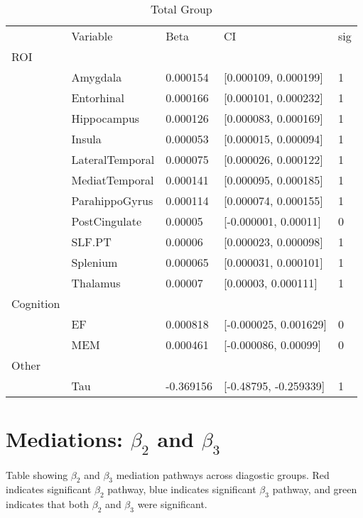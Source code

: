 \documentclass{article}
\begin{document}
\begin{table}[H]
\centering
\caption{Total Group} 
\begin{tabular}{lllll}
   & Variable & Beta & CI & sig \\ 
 ROI &   &   &   &  \\ 
   \rowcolor{green!10}  & Amygdala & 0.000154 & [0.000109, 0.000199] & 1 \\ 
   \rowcolor{green!10}  & Entorhinal & 0.000166 & [0.000101, 0.000232] & 1 \\ 
   \rowcolor{green!10}  & Hippocampus & 0.000126 & [0.000083, 0.000169] & 1 \\ 
   \rowcolor{green!10}  & Insula & 0.000053 & [0.000015, 0.000094] & 1 \\ 
   \rowcolor{green!10}  & LateralTemporal & 0.000075 & [0.000026, 0.000122] & 1 \\ 
   \rowcolor{green!10}  & MediatTemporal & 0.000141 & [0.000095, 0.000185] & 1 \\ 
   \rowcolor{green!10}  & ParahippoGyrus & 0.000114 & [0.000074, 0.000155] & 1 \\ 
    & PostCingulate & 0.00005 & [-0.000001, 0.00011] & 0 \\ 
   \rowcolor{green!10}  & SLF.PT & 0.00006 & [0.000023, 0.000098] & 1 \\ 
   \rowcolor{green!10}  & Splenium & 0.000065 & [0.000031, 0.000101] & 1 \\ 
   \rowcolor{green!10}  & Thalamus & 0.00007 & [0.00003, 0.000111] & 1 \\ 
   \midrule
Cognition &   &   &   &  \\ 
    & EF & 0.000818 & [-0.000025, 0.001629] & 0 \\ 
    & MEM & 0.000461 & [-0.000086, 0.00099] & 0 \\ 
   \midrule
Other &   &   &   &  \\ 
   \rowcolor{green!10}  & Tau & -0.369156 & [-0.48795, -0.259339] & 1 \\ 
  \end{tabular}
\end{table}
\newpage
\section*{Mediations: $\beta_2$ and $\beta_3$}

Table showing $\beta_2$ and $\beta_3$ mediation pathways across diagostic groups. Red indicates significant $\beta_2$ pathway, blue indicates significant $\beta_3$ pathway, and green indicates that both $\beta_2$ and $\beta_3$ were significant.
\end{document}

